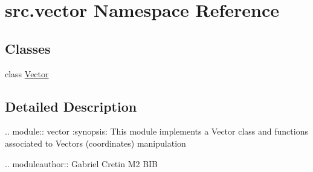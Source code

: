 \hypertarget{namespacesrc_1_1vector}{}\section{src.\+vector Namespace Reference}
\label{namespacesrc_1_1vector}
\subsection*{Classes}
\begin{DoxyCompactItemize}
\item 
class \hyperlink{classsrc_1_1vector_1_1Vector}{Vector}
\end{DoxyCompactItemize}


\subsection{Detailed Description}
\begin{DoxyVerb}.. module:: vector
   :synopsis: This module implements a Vector class and functions associated to
   Vectors (coordinates) manipulation

.. moduleauthor:: Gabriel Cretin M2 BIB
\end{DoxyVerb}
 